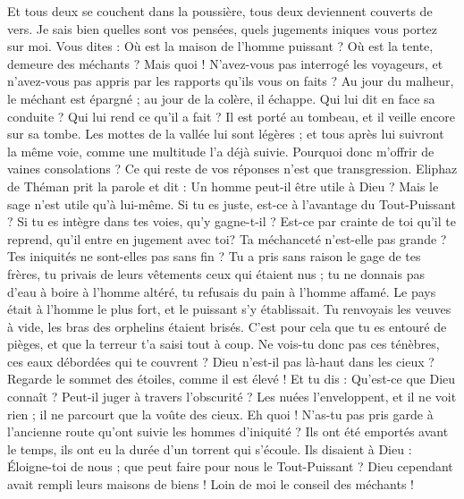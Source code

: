 \begin{multicols}{2}
Et tous deux se couchent dans la poussière, tous deux deviennent couverts de vers.
Je sais bien quelles sont vos pensées, quels jugements iniques vous portez sur moi.
Vous dites : Où est la maison de l'homme puissant ? Où est la tente, demeure des méchants ?
Mais quoi ! N'avez-vous pas interrogé les voyageurs, et n'avez-vous pas appris par les rapports qu'ils vous on faits ?
Au jour du malheur, le méchant est épargné ; au jour de la colère, il échappe.
Qui lui dit en face sa conduite ? Qui lui rend ce qu'il a fait ?
Il est porté au tombeau, et il veille encore sur sa tombe.
Les mottes de la vallée lui sont légères ; et tous après lui suivront la même voie, comme une multitude l'a déjà suivie.
Pourquoi donc m'offrir de vaines consolations ? Ce qui reste de vos réponses n'est que transgression.
\VerseOne{}Eliphaz de Théman prit la parole et dit :
Un homme peut-il être utile à Dieu ? Mais le sage n'est utile qu'à lui-même.
Si tu es juste, est-ce à l'avantage du Tout-Puissant ? Si tu es intègre dans tes voies, qu'y gagne-t-il ?
Est-ce par crainte de toi qu'il te reprend, qu'il entre en jugement avec toi?
Ta méchanceté n'est-elle pas grande ? Tes iniquités ne sont-elles pas sans fin ?
Tu a pris sans raison le gage de tes frères, tu privais de leurs vêtements ceux qui étaient nus ;
tu ne donnais pas d'eau à boire à l'homme altéré, tu refusais du pain à l'homme affamé.
Le pays était à l'homme le plus fort, et le puissant s'y établissait.
Tu renvoyais les veuves à vide, les bras des orphelins étaient brisés.
C'est pour cela que tu es entouré de pièges, et que la terreur t'a saisi tout à coup.
Ne vois-tu donc pas ces ténèbres, ces eaux débordées qui te couvrent ?
Dieu n'est-il pas là-haut dans les cieux ? Regarde le sommet des étoiles, comme il est élevé !
Et tu dis : Qu'est-ce que Dieu connaît ? Peut-il juger à travers l'obscurité ?
Les nuées l'enveloppent, et il ne voit rien ; il ne parcourt que la voûte des cieux.
Eh quoi ! N'as-tu pas pris garde à l'ancienne route qu'ont suivie les hommes d'iniquité ?
Ils ont été emportés avant le temps, ils ont eu la durée d'un torrent qui s'écoule.
Ils disaient à Dieu : Éloigne-toi de nous ; que peut faire pour nous le Tout-Puissant ?
Dieu cependant avait rempli leurs maisons de biens ! Loin de moi le conseil des méchants !

\end{multicols}
